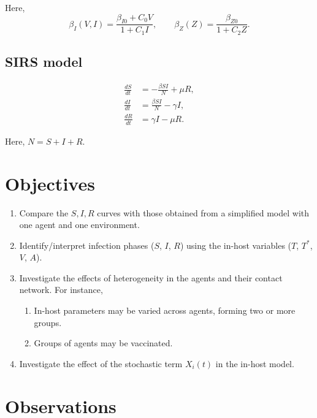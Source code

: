 \documentclass[11pt]{article}
\begin{document}
    Here, \[
        \beta_I(V, I) = \frac{\beta_{I0} + C_0 V}{1 + C_1 I}, \qquad
        \beta_Z(Z) = \frac{\beta_{Z0}}{1 + C_2 Z}.
    \]


    \subsection{SIRS model}

    \begin{align}
        \frac{dS}{dt} &= -\frac{\beta SI}{N} + \mu R, \\
        \frac{dI}{dt} &= \frac{\beta SI}{N} - \gamma I, \\
        \frac{dR}{dt} &= \gamma I - \mu R.
    \end{align}

    Here, $N = S + I + R$.


    \section{Objectives}

    \begin{enumerate}
        \item Compare the $S, I, R$ curves with those obtained from a
        simplified model with one agent and one environment.

        \item Identify/interpret infection phases ($S$, $I$, $R$) using the
        in-host variables ($T$, $T^*$, $V$, $A$).

        \item Investigate the effects of heterogeneity in the agents and their
        contact network. For instance,
        \begin{enumerate}
            \item In-host parameters may be varied across agents, forming two
            or more groups.
            \item Groups of agents may be vaccinated.
        \end{enumerate}

        \item Investigate the effect of the stochastic term $X_i(t)$ in the
        in-host model.
    \end{enumerate}


    \section{Observations}
\end{document}
